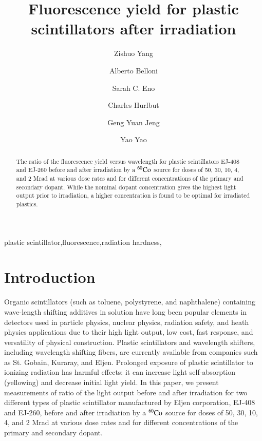 \documentclass[review]{elsarticle}
\begin{document}
\begin{frontmatter}

\title{Fluorescence yield for plastic scintillators after irradiation }


\author[umd]{Zishuo Yang}
\author[umd]{Alberto Belloni}
\author[umd]{Sarah C. Eno}
\author[eljen]{Charles Hurlbut}
\author[umd]{Geng Yuan Jeng}
\author[umd]{Yao Yao}




\address[umd]{Dept. Physics, U. Maryland, College Park MD 30742 USA}
\address[eljen]{Eljen Technology, 1300 W. Broadway, Sweetwater, Tx 79556 USA}


\begin{abstract}
The ratio of the fluorescence yield versus wavelength for plastic scintillators EJ-408 and EJ-260 before and after irradiation by a $\rm {^{60}Co}$ source for doses of 50, 30, 10, 4, and 2 Mrad at various dose rates and for different concentrations of the primary and secondary dopant.  While the nominal dopant concentration gives the highest light output prior to irradiation, a higher concentration is found to be optimal for irradiated plastics.
\end{abstract}

\begin{keyword}
plastic scintillator\sep fluorescence\sep radiation hardness\sep 
\end{keyword}

\end{frontmatter}

\linenumbers

\section{Introduction}
Organic scintillators (such as toluene, polystyrene, and naphthalene) containing wave-length shifting
additives in solution have long been popular elements in detectors used
in particle physics, nuclear physics, radiation safety, and heath physics applications  due to their high light output, low cost, fast response,
and versatility of physical construction. 
Plastic scintillators and wavelength shifters, including
wavelength shifting fibers, are currently available
from companies such as St. Gobain, Kuraray, and Eljen.
Prolonged exposure of plastic scintillator to
ionizing radiation has harmful effects: it can increase
light self-absorption (yellowing) and  decrease
initial light yield.  
In this paper, we present measurements of ratio of the light output before and after irradiation
for two different types of plastic scintillator manufactured by Eljen corporation, EJ-408 and EJ-260, before and after irradiation by a $\rm {^{60}Co}$ source for doses of 50, 30, 10, 4, and 2 Mrad at various dose rates and for different concentrations of the primary and secondary dopant.
\end{document}
